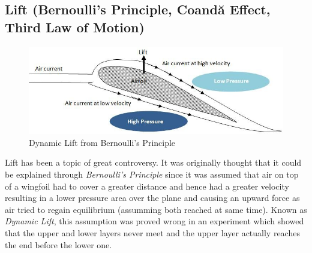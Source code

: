 \documentclass[12pt]{article}
\begin{document}
\subsection{Lift (Bernoulli's Principle, Coandă Effect, Third Law of Motion)}
\begin{figure}[h!]
	\begin{center}
		\includegraphics[scale=0.4]{dynamic}
	\end{center}
	\caption{Dynamic Lift from Bernoulli's Principle}
	\label{fig:Dynamic Lift}
\end{figure}
Lift has been a topic of great controversy. It was originally thought that it could be explained through \emph{Bernoulli's Principle} since it was assumed that air on top of a wingfoil had to cover a greater distance and hence had a greater velocity resulting in a lower pressure area over the plane and causing an upward force as air tried to regain equilibrium (assumming both reached at same time). Known as \emph{Dynamic Lift}, this assumption was proved wrong in an experiment which showed that the upper and lower layers never meet and the upper layer actually reaches the end before the lower one. 
\end{document}

